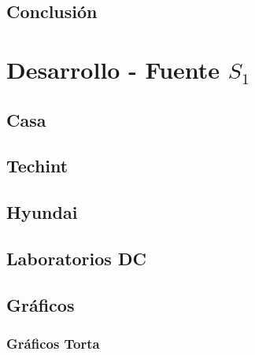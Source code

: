 \documentclass[final,narroweqnarray,inline]{ieee}
\begin{document}
  \subsection{Conclusión}

\newpage
\section{Desarrollo - Fuente $S_1$}
  \subsection{Casa}

  \subsection{Techint}

  \subsection{Hyundai}

  \subsection{Laboratorios DC}

  \subsection{Gráficos}
  \subsubsection*{Gráficos Torta}
\end{document}
